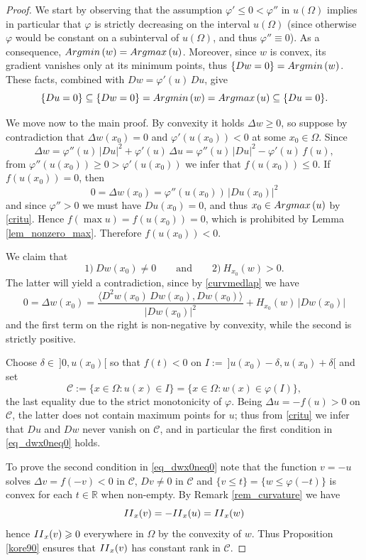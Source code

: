 \documentclass[12pt]{amsart}
\numberwithin{equation}{section}
\theoremstyle{plain}
\theoremstyle{plain}
\theoremstyle{plain}
\theoremstyle{definition}
\newcommand{\R}{{\mathbb R}}
\newcommand{\beq}{\begin{equation}}
\newcommand{\eeq}{\end{equation}}
\renewcommand{\le}{\leqslant}
\renewcommand{\ge}{\geqslant}
\begin{document}
 \begin{proof} 
We start by observing that the assumption $\varphi'\le 0<\varphi''$ in $u(\Omega)$ implies in particular that $\varphi$ is strictly decreasing on the interval $u(\Omega)$ (since otherwise $\varphi$ would be constant on a subinterval of $u(\Omega)$, and thus $\varphi''\equiv 0$). 
As a consequence, ${\rm Argmin}\, (w)={\rm Argmax}\, (u)$. 
Moreover, since $w$ is convex, its gradient vanishes only at its minimum points, thus $\{Dw=0\}={\rm Argmin}\, (w)$.
These facts, combined with $ Dw=\varphi'(u)\, Du$, give
 \beq
 \label{critu}
 \{Du=0\}\subseteq \{Dw=0\}={\rm Argmin}\, (w)={\rm Argmax}\, (u)\subseteq \{Du=0\}.
 \eeq
 
 We move now to the main proof. 
 By convexity it holds $\Delta w\ge 0$, so suppose by contradiction that $\Delta w(x_0)=0$ and $\varphi'(u(x_0))<0$ at some $x_0\in \Omega$. 
Since
\[
 \Delta w=\varphi''(u)\, |D u|^2+\varphi'(u)\, \Delta u=\varphi''(u)\, |D u|^2-\varphi'(u)\, f(u),
 \]
 from $\varphi''(u(x_0))\ge 0 > \varphi'(u(x_0))$ we infer that $f(u(x_0))\le 0$. 
 If $f(u(x_0))=0$, then 
 \[
 0=\Delta w(x_0)=\varphi''(u(x_0))\, |D u(x_0)|^2
 \]
 and since $\varphi''>0$ we must have $Du(x_0)=0$, and thus $x_0 \in {\rm Argmax}\, (u)$ by \eqref{critu}. 
Hence $f(\max u) = f(u(x_0))=0$, which is prohibited by Lemma \ref{lem_nonzero_max}. 
Therefore $f(u(x_0))<0$. 
 
We claim that
\begin{equation}\label{eq_dwx0neq0}
1)\ Dw(x_0)\neq 0\qquad\text{and}\qquad 2)\ H_{x_0}(w)>0.
\end{equation}
The latter will yield a contradiction, since by \eqref{curvmedlap} we have
\[
 0=\Delta w(x_0)=\frac{\langle D^2w(x_0)\,Dw(x_0), Dw(x_0)\rangle}{|Dw(x_0)|^2}+H_{x_0}(w)\, |Dw(x_0)|
\]
and the first term on the right is non-negative by convexity, while the second is strictly positive.	

Choose $\delta \in \ ]0, u(x_0)[$ so that $f(t)< 0$ on $I:=\ ]u(x_0)-\delta, u(x_0)+\delta[$ and set
 \[
 {\mathcal C}:=\big\{x\in \Omega: u(x)\in I\big\}
=\big\{x\in \Omega: w(x)\in \varphi (I)\big\},
 \]
 the last equality due to the strict monotonicity of $\varphi$. 
 Being 
$\Delta u = -f(u)>0$ on ${\mathcal C}$, 
 the latter does not contain maximum points for $u$; thus from \eqref{critu} we infer that $Du$ and $Dw$ never vanish on ${\mathcal C}$, and in particular the first condition in \eqref{eq_dwx0neq0} holds. 

To prove the second condition in \eqref{eq_dwx0neq0} note that the function $v=-u$ solves $\Delta v=f(-v)<0$ in ${\mathcal C}$, $Dv\ne 0$ in ${\mathcal C}$ and $\{v \leq t\}=\{w \leq \varphi(-t)\}$ is convex for each $t \in \R$ when non-empty. 
By Remark \ref{rem_curvature} we have
 \[
 {\rm II}_{x}(v)=-{\rm II}_{x}(u)={\rm II}_{x}(w)
 \]
hence ${\rm II}_x(v)\ge 0$ everywhere in $\Omega$ by the convexity of $w$.
Thus Proposition \ref{kore90} ensures that ${\rm II}_{x}(v)$ has constant rank in ${\mathcal C}$.


\end{proof}
\end{document}
